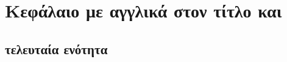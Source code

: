 \section{\texorpdfstring{Kεφάλαιο με αγγλικά στον τίτλο και }{Kεφάλαιο με αγγλικά στον τίτλο και pdf}}
\subsection{τελευταία ενότητα}
\en{\lipsum}

\en{\lipsum}